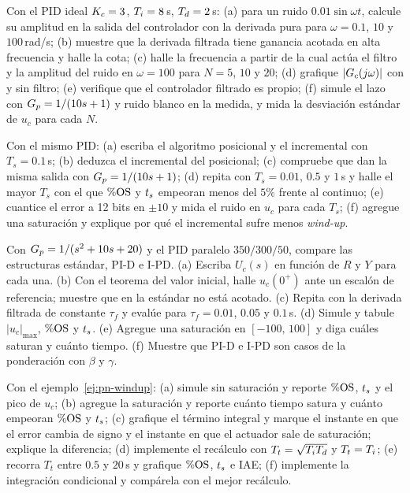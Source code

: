 \begin{problema}\label{prob:pn-ruido}
Con el PID ideal $K_c=3$, $T_i=8$\,s, $T_d=2$\,s: (a) para un ruido $0.01\sin\omega t$, calcule su amplitud en la salida del controlador con la derivada pura para $\omega=0.1$, $10$ y $100$\,rad/s; (b) muestre que la derivada filtrada tiene ganancia acotada en alta frecuencia y halle la cota; (c) halle la frecuencia a partir de la cual actúa el filtro y la amplitud del ruido en $\omega=100$ para $N=5$, $10$ y $20$; (d) \etiquetaM{} grafique $|G_c(j\omega)|$ con y sin filtro; (e) verifique que el controlador filtrado es propio; (f) \etiquetaM{} simule el lazo con $G_p=1/(10s+1)$ y ruido blanco en la medida, y mida la desviación estándar de $u_c$ para cada $N$.
\end{problema}

\begin{problema}\label{prob:pn-digital}
Con el mismo PID: (a) escriba el algoritmo posicional y el incremental con $T_s=0.1$\,s; (b) deduzca el incremental del posicional; (c) \etiquetaM{} compruebe que dan la misma salida con $G_p=1/(10s+1)$; (d) \etiquetaM{} repita con $T_s=0.01$, $0.5$ y $1$\,s y halle el mayor $T_s$ con el que $\%\mathrm{OS}$ y $t_s$ empeoran menos del $5\%$ frente al continuo; (e) \etiquetaEstrella{} cuantice el error a 12 bits en $\pm10$ y mida el ruido en $u_c$ para cada $T_s$; (f) agregue una saturación y explique por qué el incremental sufre menos \emph{wind-up}.
\end{problema}

\begin{problema}\label{prob:pn-kicks}
Con $G_p=1/(s^2+10s+20)$ y el PID paralelo $350/300/50$, compare las estructuras estándar, PI-D e I-PD. (a) Escriba $U_c(s)$ en función de $R$ y $Y$ para cada una. (b) Con el teorema del valor inicial, halle $u_c(0^+)$ ante un escalón de referencia; muestre que en la estándar no está acotado. (c) Repita con la derivada filtrada de constante $\tau_f$ y evalúe para $\tau_f=0.01$, $0.05$ y $0.1$\,s. (d) \etiquetaM{} Simule y tabule $|u_c|_{\max}$, $\%\mathrm{OS}$ y $t_s$. (e) \etiquetaM{} Agregue una saturación en $[-100,\,100]$ y diga cuáles saturan y cuánto tiempo. (f) Muestre que PI-D e I-PD son casos de la ponderación con $\beta$ y $\gamma$.
\end{problema}

\begin{problema}\label{prob:pn-windup}
Con el ejemplo~\ref{ej:pn-windup}: (a) \etiquetaM{} simule sin saturación y reporte $\%\mathrm{OS}$, $t_s$ y el pico de $u_c$; (b) agregue la saturación y reporte cuánto tiempo satura y cuánto empeoran $\%\mathrm{OS}$ y $t_s$; (c) grafique el término integral y marque el instante en que el error cambia de signo y el instante en que el actuador sale de saturación; explique la diferencia; (d) implemente el recálculo con $T_t=\sqrt{T_iT_d}$ y $T_t=T_i$; (e) recorra $T_t$ entre $0.5$ y $20$\,s y grafique $\%\mathrm{OS}$, $t_s$ e IAE; (f) implemente la integración condicional y compárela con el mejor recálculo.
\end{problema}

